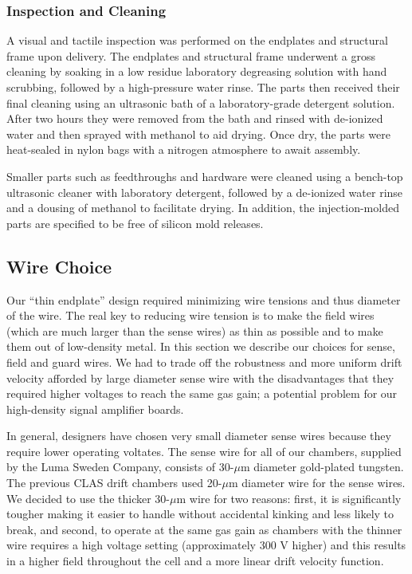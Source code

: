 \subsubsection{Inspection and Cleaning}

A visual and tactile inspection was performed on the endplates and 
structural frame upon delivery.  The endplates and structural 
frame underwent a gross cleaning by soaking in a low residue laboratory 
degreasing solution with hand scrubbing, followed by a high-pressure water 
rinse. The parts then received their final cleaning using an ultrasonic 
bath of a laboratory-grade detergent solution.  After two hours they were
removed from the bath and rinsed with de-ionized water and then sprayed 
with methanol to aid drying. Once dry, the parts were heat-sealed in nylon 
bags with a nitrogen atmosphere to await assembly.

Smaller parts such as feedthroughs and hardware were cleaned using a 
bench-top ultrasonic cleaner with laboratory detergent, followed by a 
de-ionized water rinse and a dousing of methanol to facilitate drying.  
In addition, the injection-molded parts are specified to be free of silicon 
mold releases.



\subsection{Wire Choice}
\hskip 0.15in
Our ``thin endplate'' design required minimizing wire tensions and
thus diameter of the wire.  The real key to reducing wire tension is to
make the field wires (which are much larger than the sense wires) as 
thin as possible and to make them out of low-density metal.  In this 
section we describe our choices for sense, field and guard wires.
We had to trade off the robustness and more uniform drift velocity
afforded by large diameter sense wire with the disadvantages that they
required higher voltages to reach the same gas gain; 
a potential problem for our high-density signal amplifier boards.

In general, designers have chosen very small diameter sense wires because they
require lower operating voltates.
The sense wire for all of our chambers, supplied by the Luma
Sweden Company, consists of 30-$\mu$m diameter gold-plated tungsten.  
The previous CLAS drift chambers used 20-$\mu$m diameter wire for the
sense wires.  We decided to use the thicker 30-$\mu$m wire for two 
reasons: first, it is significantly tougher making it easier to handle without
accidental kinking and less likely to break, and second, to operate at the same 
gas gain as chambers with the thinner wire requires a high voltage setting 
(approximately 300 V higher) and this results in a higher field throughout the cell
and a more linear drift velocity function.  

